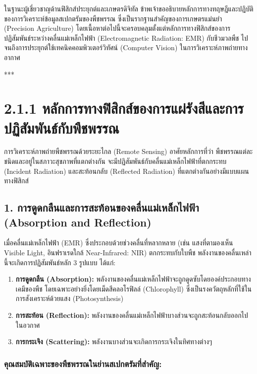 \documentclass[11pt,a4paper,openany]{report}
\begin{document}
ในฐานะผู้เชี่ยวชาญด้านฟิสิกส์ประยุกต์และเกษตรดิจิทัล ข้าพเจ้าขออธิบายหลักการทางทฤษฎีและปฏิบัติของการวิเคราะห์ข้อมูลสเปกตรัมของพืชพรรณ ซึ่งเป็นรากฐานสำคัญของการเกษตรแม่นยำ (Precision Agriculture) โดยเนื้อหาต่อไปนี้จะครอบคลุมตั้งแต่หลักการทางฟิสิกส์ของการปฏิสัมพันธ์ระหว่างคลื่นแม่เหล็กไฟฟ้า (Electromagnetic Radiation: EMR) กับชีวมวลพืช ไปจนถึงการประยุกต์ใช้เทคนิคคอมพิวเตอร์วิทัศน์ (Computer Vision) ในการวิเคราะห์ภาพถ่ายทางอากาศ

***

\section{2.1.1 หลักการทางฟิสิกส์ของการแผ่รังสีและการปฏิสัมพันธ์กับพืชพรรณ}


การวิเคราะห์ภาพถ่ายพืชพรรณด้วยระยะไกล (Remote Sensing) อาศัยหลักการที่ว่า พืชพรรณแต่ละชนิดและอยู่ในสภาวะสุขภาพที่แตกต่างกัน จะมีปฏิสัมพันธ์กับคลื่นแม่เหล็กไฟฟ้าที่ตกกระทบ (Incident Radiation) และสะท้อนกลับ (Reflected Radiation) ที่แตกต่างกันอย่างมีแบบแผนทางฟิสิกส์

\subsection{1. การดูดกลืนและการสะท้อนของคลื่นแม่เหล็กไฟฟ้า (Absorption and Reflection)}


เมื่อคลื่นแม่เหล็กไฟฟ้า (EMR) ซึ่งประกอบด้วยช่วงคลื่นที่หลากหลาย (เช่น แสงที่ตามองเห็น Visible Light, อินฟราเรดใกล้ Near-Infrared: NIR) ตกกระทบกับใบพืช พลังงานของคลื่นเหล่านี้จะเกิดการปฏิสัมพันธ์หลัก 3 รูปแบบ ได้แก่:

\begin{enumerate}
  \item \textbf{การดูดกลืน (Absorption):} พลังงานของคลื่นแม่เหล็กไฟฟ้าจะถูกดูดซับโดยองค์ประกอบทางเคมีของพืช โดยเฉพาะอย่างยิ่งโดยเม็ดสีคลอโรฟิลล์ (Chlorophyll) ซึ่งเป็นรงควัตถุหลักที่ใช้ในการสังเคราะห์ด้วยแสง (Photosynthesis)
  \item \textbf{การสะท้อน (Reflection):} พลังงานของคลื่นแม่เหล็กไฟฟ้าบางส่วนจะถูกสะท้อนกลับออกไปในอวกาศ
  \item \textbf{การกระเจิง (Scattering):} พลังงานบางส่วนจะเกิดการกระเจิงในทิศทางต่างๆ
\end{enumerate}


\subsubsection{คุณสมบัติเฉพาะของพืชพรรณในย่านสเปกตรัมที่สำคัญ:}
\end{document}
